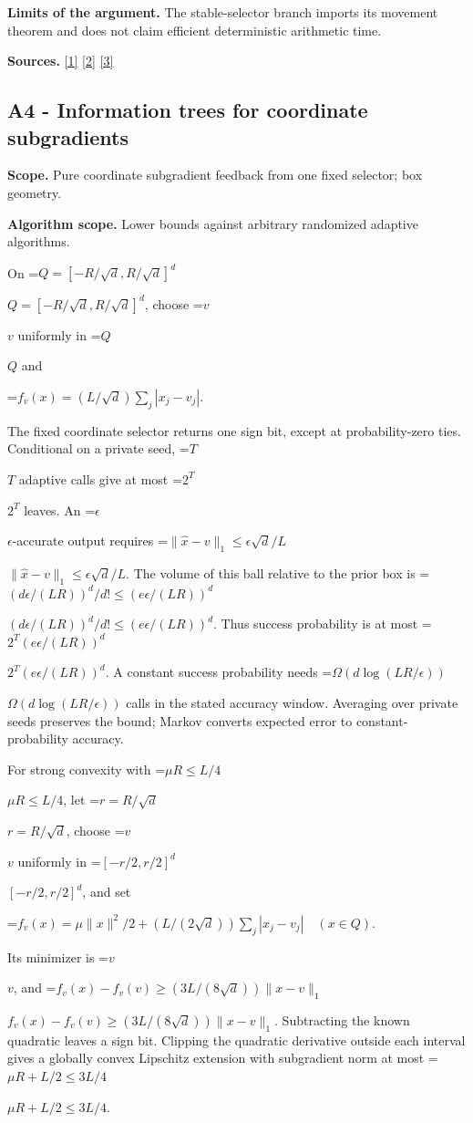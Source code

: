 \documentclass[10pt,a4paper]{article}
\newcommand{\AtlasMath}[1]{\par\begingroup\centering\setbox0=\hbox{$\displaystyle #1$}\ifdim\wd0>1.4\linewidth\typeout{ATLAS WIDE FORMULA: \the\wd0}\fi\ifdim\wd0>\linewidth\resizebox{\linewidth}{!}{\box0}\else\box0\fi\par\endgroup}
\newcommand{\AtlasInlineMath}[1]{\begingroup\setbox0=\hbox{$#1$}\ifdim\wd0>.4\linewidth\endgroup\AtlasMath{#1}\else\endgroup$#1$\fi}
\begin{document}
\textbf{Limits of the argument.} The stable-selector branch imports its movement theorem and does not claim efficient deterministic arithmetic time.

\textbf{Sources.} \href{https://arxiv.org/pdf/1405.4980}{[1]} \href{https://www2.isye.gatech.edu/~nemirovs/MOR_AccuracyCertificates.pdf}{[2]} \href{https://arxiv.org/pdf/2609.20701}{[3]}

\subsection{A4 - Information trees for coordinate subgradients}
\textbf{Scope.} Pure coordinate subgradient feedback from one fixed selector; box geometry.

\textbf{Algorithm scope.} Lower bounds against arbitrary randomized adaptive algorithms.

On \AtlasInlineMath{Q=[-R/\sqrt d,R/\sqrt d]^d}, choose \AtlasInlineMath{v} uniformly in \AtlasInlineMath{Q} and

\AtlasMath{f_v(x)=(L/\sqrt d)\sum_j|x_j-v_j|.}

The fixed coordinate selector returns one sign bit, except at probability-zero ties. Conditional on a private seed, \AtlasInlineMath{T} adaptive calls give at most \AtlasInlineMath{2^T} leaves. An \AtlasInlineMath{\epsilon}-accurate output requires
\AtlasInlineMath{\|\widehat x-v\|_1\le\epsilon\sqrt d/L}.
The volume of this ball relative to the prior box is
\AtlasInlineMath{(d\epsilon/(LR))^d/d!\le(e\epsilon/(LR))^d}.
Thus success probability is at most
\AtlasInlineMath{2^T(e\epsilon/(LR))^d}.
A constant success probability needs \AtlasInlineMath{\Omega(d\log(LR/\epsilon))} calls in the stated accuracy window. Averaging over private seeds preserves the bound; Markov converts expected error to constant-probability accuracy.

For strong convexity with \AtlasInlineMath{\mu R\le L/4}, let \AtlasInlineMath{r=R/\sqrt d}, choose \AtlasInlineMath{v} uniformly in \AtlasInlineMath{[-r/2,r/2]^d}, and set

\AtlasMath{f_v(x)=\mu\|x\|^2/2+(L/(2\sqrt d))\sum_j|x_j-v_j|
\quad(x\in Q).}

Its minimizer is \AtlasInlineMath{v}, and
\AtlasInlineMath{f_v(x)-f_v(v)\ge(3L/(8\sqrt d))\|x-v\|_1}.
Subtracting the known quadratic leaves a sign bit. Clipping the quadratic derivative outside each interval gives a globally convex Lipschitz extension with subgradient norm at most \AtlasInlineMath{\mu R+L/2\le3L/4}.
\end{document}

